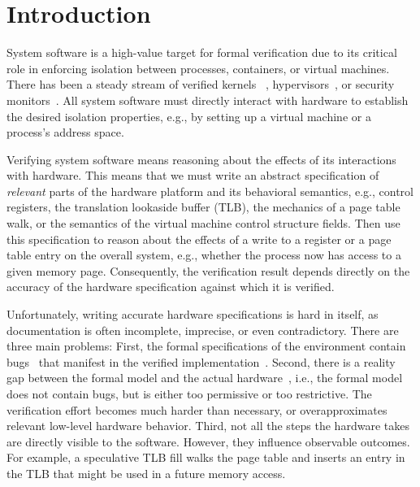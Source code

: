 \section{Introduction}\label{sec:intro}    %

%
% 
System software is a high-value target for formal verification due to its critical role in enforcing isolation between processes, containers, or virtual machines.
There has been a steady stream of verified kernels
~\cite{Klein:2009:seL4, Gu:2016:CertiKOS, Chen:2025:Atmosphere}, hypervisors~\cite{Tao:2021:seKVMArm}, or security monitors~\cite{Zhou:2024:Verismo}.
All system software must directly interact with hardware to establish the desired isolation properties, e.g., by setting up a virtual machine or a process's address space. 

Verifying system software means reasoning about the effects of its interactions with hardware.
This means that we must write an abstract specification of \emph{relevant} parts of the hardware platform and its behavioral semantics, e.g., control registers, the translation lookaside buffer (TLB), the mechanics of a page table walk, or the semantics of the virtual machine control structure fields. 
Then use this specification to reason about the effects of a write to a register or a page table entry on the overall system, e.g., whether the process now has access to a given memory page.
Consequently, the verification result depends directly on the accuracy of the hardware specification against which it is verified.


%
Unfortunately, writing accurate hardware specifications is hard in itself, as documentation is often incomplete, imprecise, or even contradictory. 
There are three main problems: 
First, the formal specifications of the environment contain bugs~\cite{Fonseca:2017:EnvironmentBugs} that manifest in the verified implementation~\cite{goldweber2024ironspec,reid2016trustworthy}.
Second, there is a reality gap between the formal model and the actual hardware~\cite{Gleirscher:2019:RealityGap, Bognar:2022:MindTheGap}, i.e., the formal model does not contain bugs, but is either too permissive or too restrictive. The verification effort becomes much harder than necessary, or overapproximates relevant low-level hardware behavior.
Third, not all the steps the hardware takes are directly visible to the software. However, they influence observable outcomes. For example, a speculative TLB fill walks the page table and inserts an entry in the TLB that might be used in a future memory access. 

